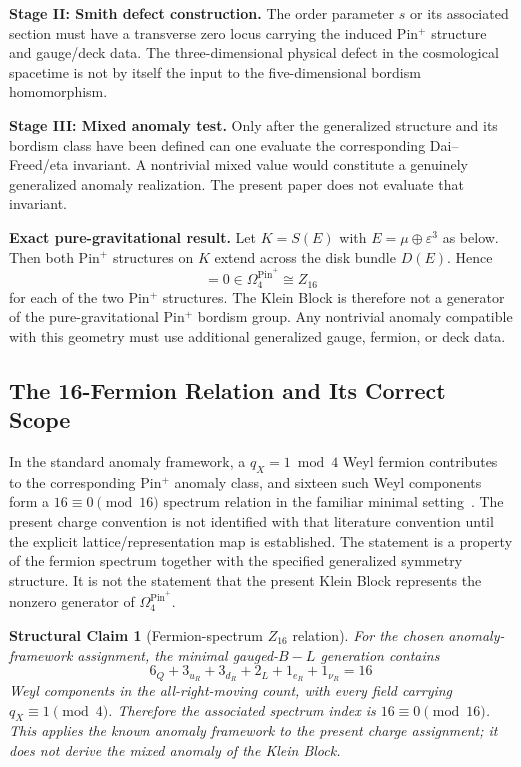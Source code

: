 \documentclass[11pt]{article}
\theoremstyle{canonmath}
\theoremstyle{canonpostulate}
\theoremstyle{canonclaim}
\newtheorem{structuralclaim}{Structural Claim}[section]
\providecommand{\Klein}{\mathcal{K}}
\providecommand{\Pin}{\operatorname{Pin}}
\def\mathbb#1{#1}%
\def\mathcal#1{#1}%
\begin{document}
\textbf{Stage II: Smith defect construction.} The order parameter $s$ or its associated section must have a transverse zero locus carrying the induced Pin$^+$ structure and gauge/deck data. The three-dimensional physical defect in the cosmological spacetime is not by itself the input to the five-dimensional bordism homomorphism.

\textbf{Stage III: Mixed anomaly test.} Only after the generalized structure and its bordism class have been defined can one evaluate the corresponding Dai--Freed/eta invariant. A nontrivial mixed value would constitute a genuinely generalized anomaly realization. The present paper does not evaluate that invariant.

\begin{keyresult}
\textbf{Exact pure-gravitational result.} Let $\Klein=S(E)$ with $E=\mu\oplus\varepsilon^3$ as below. Then both Pin$^+$ structures on $\Klein$ extend across the disk bundle $D(E)$. Hence
\begin{equation}
[\Klein,P_{\Pin^+}]=0\in\Omega_4^{\Pin^+}\cong\mathbb Z_{16}
\end{equation}
for each of the two Pin$^+$ structures. The Klein Block is therefore not a generator of the pure-gravitational Pin$^+$ bordism group. Any nontrivial anomaly compatible with this geometry must use additional generalized gauge, fermion, or deck data.
\end{keyresult}

\subsection{The 16-Fermion Relation and Its Correct Scope}

In the standard anomaly framework, a $q_X=1\bmod4$ Weyl fermion contributes to the corresponding Pin$^+$ anomaly class, and sixteen such Weyl components form a $16\equiv0\pmod{16}$ spectrum relation in the familiar minimal setting~\cite{GarciaEtxebarria,Wang2020}. The present charge convention is not identified with that literature convention until the explicit lattice/representation map is established. The statement is a property of the fermion spectrum together with the specified generalized symmetry structure. It is not the statement that the present Klein Block represents the nonzero generator of $\Omega_4^{\Pin^+}$.

\begin{structuralclaim}[Fermion-spectrum $\mathbb Z_{16}$ relation] \label{claim:16}
For the chosen anomaly-framework assignment, the minimal gauged-$B-L$ generation contains
\begin{equation}
6_Q+3_{u_R}+3_{d_R}+2_L+1_{e_R}+1_{\nu_R}=16
\end{equation}
Weyl components in the all-right-moving count, with every field carrying $q_X\equiv1\pmod4$. Therefore the associated spectrum index is $16\equiv0\pmod{16}$. This applies the known anomaly framework to the present charge assignment; it does not derive the mixed anomaly of the Klein Block.
\end{structuralclaim}
\end{document}

